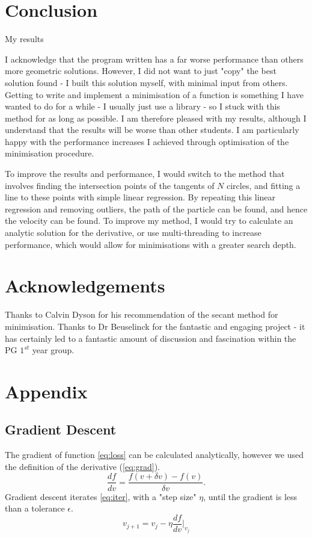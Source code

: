 \documentclass[11pt]{article}
\begin{document}
\section{Conclusion}
\label{sec:conclusion}
My results

I acknowledge that the program written has a far worse performance than others more geometric solutions. However, I did not want to just "copy" the best solution found - I built this solution myself, with minimal input from others. Getting to write and implement a minimisation of a function is something I have wanted to do for a while - I usually just use a library - so I stuck with this method for as long as possible. I am therefore pleased with my results, although I understand that the results will be worse than other students. I am particularly happy with the performance increases I achieved through optimisation of the minimisation procedure.

To improve the results and performance, I would switch to the method that involves finding the intersection points of the tangents of $N$ circles, and fitting a line to these points with simple linear regression. By repeating this linear regression and removing outliers, the path of the particle can be found, and hence the velocity can be found. To improve my method, I would try to calculate an analytic solution for the derivative, or use multi-threading to increase performance, which would allow for minimisations with a greater search depth.

\section{Acknowledgements}
\label{sec:acknowledgements}
Thanks to Calvin Dyson for his recommendation of the secant method for minimisation. Thanks to Dr Beuselinck for the fantastic and engaging project - it has certainly led to a fantastic amount of discussion and fascination within the PG $1^{st}$ year group.


\printbibliography

\appendix
\section{Appendix}
\subsection{Gradient Descent}
\label{app:gradient-descent}
The gradient of function \autoref{eq:loss} can be calculated analytically, however we used the definition of the derivative (\autoref{eq:grad}).
\begin{equation}
    \frac{df}{dv} = \frac{f(v + \delta v) - f(v)}{\delta v}.
    \label{eq:grad}
\end{equation}
Gradient descent iterates \autoref{eq:iter}, with a "step size" $\eta$, until the gradient is less than a tolerance $\epsilon$.
\begin{equation}
    v_{j+1} = v_j - \eta \frac{df}{dv}\Bigr|_{v_j}
    \label{eq:iter}
\end{equation}
\end{document}
